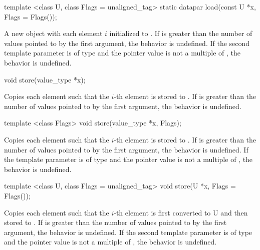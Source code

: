 \begin{itemdecl}
template <class U, class Flags = unaligned_tag> static datapar load(const U *x, Flags = Flags());
\end{itemdecl}
\begin{itemdescr}
  \pnum\returns A new \datapar object with each element $i$ initialized to  \foralli.
  \pnum\remarks If \datapar{} is greater than the number of values pointed to by the first argument, the behavior is undefined.
  \pnum\remarks If the second template parameter is of type  and the pointer value is not a multiple of , the behavior is undefined.
\end{itemdescr}

\begin{itemdecl}
void store(value_type *x);
\end{itemdecl}
\begin{itemdescr}
  \pnum\effects Copies each element such that the $i$-th element is stored to .
  \pnum\remarks If \datapar{} is greater than the number of values pointed to by the first argument, the behavior is undefined.
\end{itemdescr}

\begin{itemdecl}
template <class Flags> void store(value_type *x, Flags);
\end{itemdecl}
\begin{itemdescr}
  \pnum\effects Copies each element such that the $i$-th element is stored to .
  \pnum\remarks If \datapar{} is greater than the number of values pointed to by the first argument, the behavior is undefined.
  \pnum\remarks If the template parameter is of type  and the pointer value is not a multiple of , the behavior is undefined.
\end{itemdescr}

\begin{itemdecl}
template <class U, class Flags = unaligned_tag> void store(U *x, Flags = Flags());
\end{itemdecl}
\begin{itemdescr}
  \pnum\effects Copies each element such that the $i$-th element is first converted to \type U and then stored to .
  \pnum\remarks If \datapar{} is greater than the number of values pointed to by the first argument, the behavior is undefined.
  \pnum\remarks If the second template parameter is of type  and the pointer value is not a multiple of , the behavior is undefined.
\end{itemdescr}

